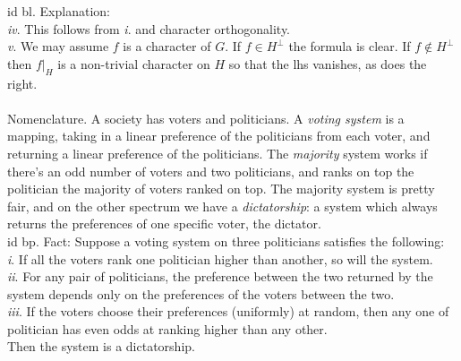 \documentclass[oneside]{book}
\renewcommand{\i}{{\it i}. }
\newcommand{\ii}{{\it ii}. }
\newcommand{\iii}{{\it iii}. }
\newcommand{\iv}{{\it iv}. }
\renewcommand{\v}{{\it v}. }
\newcommand{\nin}{\not\in}
\begin{document}
id bl. Explanation: \\
\iv This follows from \i and character orthogonality.   \\
\v We may assume $f$ is a character of $G$. If $f\in H^\perp$ the formula is clear. If $f\nin H^\perp$ then $f\rvert_H$ is a non-trivial character on $H$ so that the lhs vanishes, as does the right.  \\\\


Nomenclature. A society has voters and politicians. A {\it voting system} is a mapping, taking in a linear preference of the politicians from each voter, and returning a linear preference of the politicians. The {\it majority} system works if there's an odd number of voters and two politicians, and ranks on top the politician the majority of voters ranked on top. The majority system is pretty fair, and on the other spectrum we have a {\it dictatorship}: a system which always returns the preferences of one specific voter, the dictator.    \\


id bp. Fact: Suppose a voting system on three politicians satisfies the following:  \\
\i If all the voters rank one politician higher than another, so will the system.  \\
\ii For any pair of politicians, the preference between the two returned by the system depends only on the preferences of the voters between the two.  \\
\iii If the voters choose their preferences (uniformly) at random, then any one of politician has even odds at ranking higher than any other.  \\
Then the system is a dictatorship.  \\\\
\end{document}
